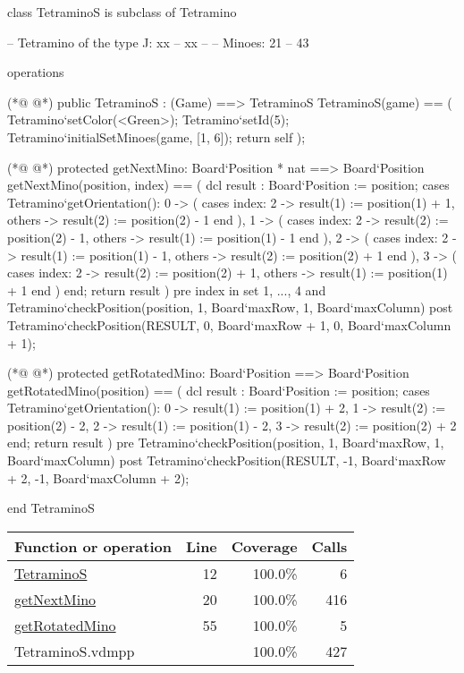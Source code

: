 \begin{vdmpp}[breaklines=true]
class TetraminoS is subclass of Tetramino
  
 -- Tetramino of the type J:  xx
 --        xx
 --
 -- Minoes:       21
 --        43
 
 
 operations
 
(*@
\label{TetraminoS:12}
@*)
  public TetraminoS : (Game) ==> TetraminoS
  TetraminoS(game) == (
   Tetramino`setColor(<Green>);
   Tetramino`setId(5);
   Tetramino`initialSetMinoes(game, [1, 6]);
   return self
  );
   
(*@
\label{getNextMino:20}
@*)
  protected getNextMino: Board`Position * nat ==> Board`Position
  getNextMino(position, index) == (
   dcl result : Board`Position := position;
   cases Tetramino`getOrientation():
    0 -> (
     cases index:
      2 -> result(1) := position(1) + 1,
      others -> result(2) := position(2) - 1
     end
    ),
    1 -> (
     cases index:
      2 -> result(2) := position(2) - 1,
      others -> result(1) := position(1) - 1
     end
    ),
    2 -> (
     cases index:
      2 -> result(1) := position(1) - 1,
      others -> result(2) := position(2) + 1
     end
    ),
    3 -> (
     cases index:
      2 -> result(2) := position(2) + 1,
      others -> result(1) := position(1) + 1
     end
    )
   end;
   return result
  )
  pre index in set {1, ..., 4} 
   and Tetramino`checkPosition(position, 1, Board`maxRow, 1, Board`maxColumn)
  post Tetramino`checkPosition(RESULT, 0, Board`maxRow + 1, 0, Board`maxColumn + 1);
   
(*@
\label{getRotatedMino:55}
@*)
  protected getRotatedMino: Board`Position ==> Board`Position
  getRotatedMino(position) == (
   dcl result : Board`Position := position;
   cases Tetramino`getOrientation():
    0 -> result(1) := position(1) + 2,
    1 -> result(2) := position(2) - 2,
    2 -> result(1) := position(1) - 2,
    3 -> result(2) := position(2) + 2
   end;
   return result
  )
  pre Tetramino`checkPosition(position, 1, Board`maxRow, 1, Board`maxColumn)
  post Tetramino`checkPosition(RESULT, -1, Board`maxRow + 2, -1, Board`maxColumn + 2);

end TetraminoS
\end{vdmpp}
\bigskip
\begin{longtable}{|l|r|r|r|}
\hline
Function or operation & Line & Coverage & Calls \\
\hline
\hline
\hyperref[TetraminoS:12]{TetraminoS} & 12&100.0\% & 6 \\
\hline
\hyperref[getNextMino:20]{getNextMino} & 20&100.0\% & 416 \\
\hline
\hyperref[getRotatedMino:55]{getRotatedMino} & 55&100.0\% & 5 \\
\hline
\hline
TetraminoS.vdmpp & & 100.0\% & 427 \\
\hline
\end{longtable}

